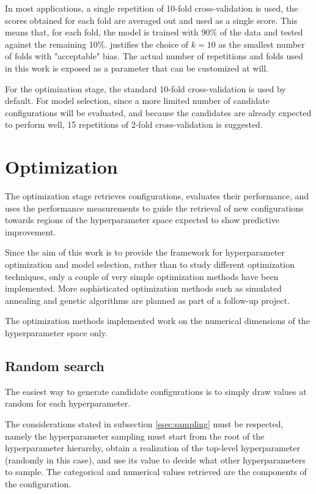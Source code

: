 In most applications, a single repetition of 10-fold cross-validation is used, the scores obtained
for each fold are averaged out and used as a single score. This means that, for each fold,
the model is trained with 90\% of the data and tested against the remaining 10\%.
\cite{kohavi1995cv} justifies the choice of $k=10$ as the smallest number of folds with "acceptable"
bias. The actual number of repetitions and folds used in this work is exposed as a parameter that
can be customized at will.

For the optimization stage, the standard 10-fold cross-validation is used by default. For model
selection, since a more limited number of candidate configurations will be evaluated, and because the
candidates are already expected to perform well, 15 repetitions of 2-fold cross-validation is suggested.

\section{Optimization}

The optimization stage retrieves configurations, evaluates their performance, and uses the
performance measurements to guide the retrieval of new configurations towards regions of the
hyperparameter space expected to show predictive improvement.

Since the aim of this work is to provide the framework for hyperparameter optimization and model
selection, rather than to study different optimization techniques, only a couple of very simple optimization
methods have been implemented. More sophisticated optimization methods such as simulated annealing
and genetic algorithms are planned as part of a follow-up project.

The optimization methods implemented work on the numerical dimensions of the hyperparameter space only.

\subsection{Random search}

The easiest way to generate candidate configurations is to simply draw values at random for each
hyperparameter.

The considerations stated in  subsection \ref{ssec:sampling} must be respected, namely the
hyperparameter sampling must start from the root of the hyperparameter hierarchy, obtain a
realization of the top-level hyperparameter (randomly in this case), and use its value to decide
what other hyperparameters to sample. The categorical and numerical values retrieved are the
components of the configuration.

